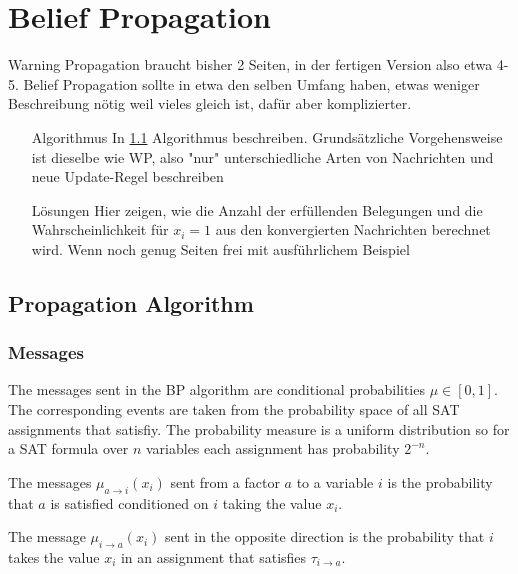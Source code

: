 \section{Belief Propagation} \label{BP}

Warning Propagation braucht bisher 2 Seiten, in der fertigen Version also etwa 4-5. Belief Propagation sollte in etwa den selben Umfang haben, etwas weniger Beschreibung nötig weil vieles gleich ist, dafür aber komplizierter.

\begin{itemize}

\item[Algorithmus] In \ref{BPA} Algorithmus beschreiben. Grundsätzliche  Vorgehensweise ist dieselbe wie WP, also "nur" unterschiedliche Arten von Nachrichten und neue Update-Regel beschreiben

\item[Lösungen] Hier zeigen, wie  die Anzahl der erfüllenden Belegungen und die Wahrscheinlichkeit für $x_i = 1$ aus den konvergierten Nachrichten berechnet wird. Wenn noch genug Seiten frei mit ausführlichem Beispiel

\end{itemize}

\subsection{Propagation Algorithm} \label{BPA}

\subsubsection{Messages}
The messages sent in the BP algorithm are conditional probabilities $\mu \in [0, 1]$. The corresponding events are taken from the probability space of all SAT assignments that satisfiy. The probability measure is a uniform distribution so for a SAT formula over $n$ variables each assignment has probability $2^{-n}$.

The messages $\mu_{a \rightarrow i}(x_i)$ sent from a factor $a$ to a variable $i$ is the probability that $a$ is satisfied conditioned on $i$ taking the value $x_i$. 

The message $\mu_{i \rightarrow a}(x_i)$ sent in the opposite direction is the probability that $i$ takes the value $x_i$ in an assignment that satisfies $\tau_{i \rightarrow a}$.

